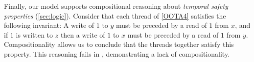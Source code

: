 Finally, our model supports compositional reasoning about \emph{temporal
  safety properties} (\textsection\ref{sec:logic}).  Consider that each
thread of \ref{OOTA4} satisfies the following invariant: A write of $1$ to
$y$ must be preceded by a read of $1$ from $x$, and if $1$ is written to $z$
then a write of $1$ to $x$ must be preceded by a read of $1$ from $y$.
Compositionality allows us to conclude that the threads together satisfy this
property.  This reasoning fails in
\cite{DBLP:conf/popl/KangHLVD17,DBLP:conf/esop/JagadeesanPR10,DBLP:journals/pacmpl/ChakrabortyV19},
demonstrating a lack of compositionality.











